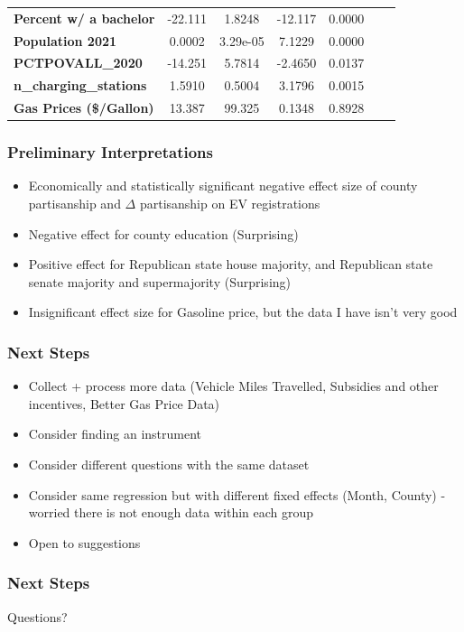 \documentclass{beamer}
\begin{document}
\begin{frame}
\begin{center}
\begin{tabular}{lcccccc}
\textbf{Percent w/ a bachelor}                                        &      -22.111       &       1.8248       &     -12.117     &      0.0000      \\
\textbf{Population 2021}                                              &       0.0002       &      3.29e-05      &      7.1229     &      0.0000      \\
\textbf{PCTPOVALL\_2020}                                              &      -14.251       &       5.7814       &     -2.4650     &      0.0137      \\
\textbf{n\_charging\_stations}                                        &       1.5910       &       0.5004       &      3.1796     &      0.0015      \\
\textbf{Gas Prices (\$/Gallon)}                                       &       13.387       &       99.325       &      0.1348     &      0.8928      \\
\bottomrule
\end{tabular}

\end{center}
\end{frame}

\begin{frame}
\frametitle{Preliminary Interpretations}
\begin{itemize}
    \item Economically and statistically significant negative effect size of county partisanship and $\Delta$ partisanship on EV registrations
    \item Negative effect for county education (Surprising)
    \item Positive effect for Republican state house majority, and Republican state senate majority and supermajority (Surprising)
    \item Insignificant effect size for Gasoline price, but the data I have isn't very good
\end{itemize}


\end{frame}

\begin{frame}
\frametitle{Next Steps}

\begin{itemize}
    \item Collect + process more data (Vehicle Miles Travelled, Subsidies and other incentives, Better Gas Price Data)
    \item Consider finding an instrument 
    \item Consider different questions with the same dataset
    \item Consider same regression but with different fixed effects (Month, County) - worried there is not enough data within each group 
    \item Open to suggestions
\end{itemize}

\end{frame}

\begin{frame}
\frametitle{Next Steps}
\centering
Questions?
\end{frame}
\end{document}
